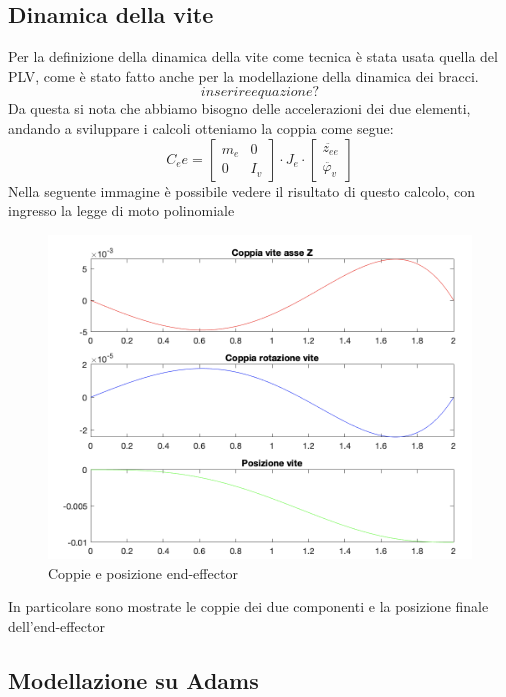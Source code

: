 \subsection{Dinamica della vite}
Per la definizione della dinamica della vite come tecnica è stata usata quella del PLV, come è stato fatto anche per la modellazione della dinamica dei bracci. 
\begin{equation*}
    inserire equazione?
\end{equation*}
Da questa si nota che abbiamo bisogno delle accelerazioni dei due elementi, andando a sviluppare i calcoli otteniamo la coppia come segue:
\begin{equation}
    C_ee = \begin{bmatrix}
    m_e & 0 \\ 0 & I_v
    \end{bmatrix}
    \cdot J_e\cdot \begin{bmatrix}
    \ddot{z_{ee}} \\ \ddot{\varphi_v}
    \end{bmatrix}
\end{equation}
Nella seguente immagine è possibile vedere il risultato di questo calcolo, con ingresso la legge di moto polinomiale
\begin{figure}[ht]
\begin{center}
    \includegraphics[scale=0.55]{Immagini/coppiaTeoricaVite.png}
    \caption{Coppie e posizione end-effector}
\end{center}
\end{figure}
In particolare sono mostrate le coppie dei due componenti e la posizione finale dell'end-effector
\subsection{Modellazione su Adams}